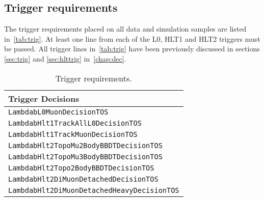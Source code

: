 





  \subsection{Trigger requirements}\label{Sec:Trigger}
 The trigger requirements placed on all data and simulation samples are listed in~\autoref{tab:trig}. At least one line from each of the L0, HLT1 and HLT2 triggers must be passed. All trigger lines in~\autoref{tab:trig} have been previously discussed in sections \ref{sec:trig} and \ref{sec:hlttrig} in~\autoref{chap:dec}.
\begin{table}[h!]
  \label{tab:trig}
  \centering
  \begin{tabular}{ l }
    
    \hline
    Trigger Decisions\\
    \hline
    \tt LambdabL0MuonDecisionTOS \\
   \hline
   \tt LambdabHlt1TrackAllL0DecisionTOS \\
   \tt LambdabHlt1TrackMuonDecisionTOS\\
   \hline
   \tt LambdabHlt2TopoMu2BodyBBDTDecisionTOS     \\
   \tt LambdabHlt2TopoMu3BodyBBDTDecisionTOS     \\
   \tt LambdabHlt2Topo2BodyBBDTDecisionTOS       \\
   \tt LambdabHlt2DiMuonDetachedDecisionTOS      \\
   \tt LambdabHlt2DiMuonDetachedHeavyDecisionTOS\\
   \hline
  \end{tabular}
  
  \caption{Trigger requirements.}
          \label{tab:trig}  
    \end{table}

